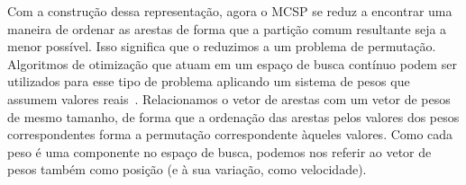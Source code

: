     Com a construção dessa representação, agora o MCSP se reduz a encontrar uma maneira de ordenar as arestas de forma que a partição comum resultante seja a menor possível. Isso significa que o reduzimos a um problema de permutação. Algoritmos de otimização que atuam em um espaço de busca contínuo podem ser utilizados para esse tipo de problema aplicando um sistema de pesos que assumem valores reais~\cite[p.~661]{marti_handbook_2018}. Relacionamos o vetor de arestas com um vetor de pesos de mesmo tamanho, de forma que a ordenação das arestas pelos valores dos pesos correspondentes forma a permutação correspondente àqueles valores. Como cada peso é uma componente no espaço de busca, podemos nos referir ao vetor de pesos também como posição (e à sua variação, como velocidade).
